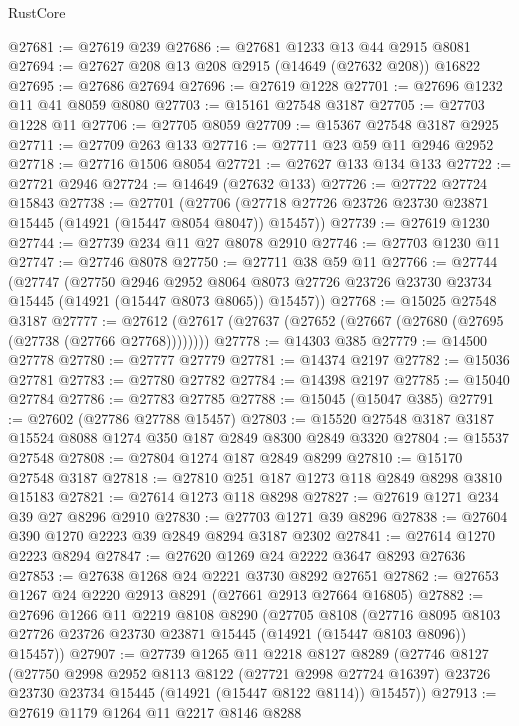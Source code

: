 \begin{lexlean}{RustCore}
\begin{coremodule}
@27681 := @27619 @239
@27686 := @27681 @1233 @13 @44 @2915 @8081
@27694 := @27627 @208 @13 @208 @2915 (@14649 (@27632 @208)) @16822
@27695 := @27686 @27694
@27696 := @27619 @1228
@27701 := @27696 @1232 @11 @41 @8059 @8080
@27703 := @15161 @27548 @3187
@27705 := @27703 @1228 @11
@27706 := @27705 @8059
@27709 := @15367 @27548 @3187 @2925
@27711 := @27709 @263 @133
@27716 := @27711 @23 @59 @11 @2946 @2952
@27718 := @27716 @1506 @8054
@27721 := @27627 @133 @134 @133
@27722 := @27721 @2946
@27724 := @14649 (@27632 @133)
@27726 := @27722 @27724 @15843
@27738 := @27701
    (@27706 (@27718 @27726 @23726 @23730 @23871 @15445 (@14921 (@15447 @8054 @8047)) @15457))
@27739 := @27619 @1230
@27744 := @27739 @234 @11 @27 @8078 @2910
@27746 := @27703 @1230 @11
@27747 := @27746 @8078
@27750 := @27711 @38 @59 @11
@27766 := @27744
    (@27747
      (@27750
        @2946
        @2952
        @8064
        @8073
        @27726
        @23726
        @23730
        @23734
        @15445
        (@14921 (@15447 @8073 @8065))
        @15457))
@27768 := @15025 @27548 @3187
@27777 := @27612 (@27617 (@27637 (@27652 (@27667 (@27680 (@27695 (@27738 (@27766 @27768))))))))
@27778 := @14303 @385
@27779 := @14500 @27778
@27780 := @27777 @27779
@27781 := @14374 @2197
@27782 := @15036 @27781
@27783 := @27780 @27782
@27784 := @14398 @2197
@27785 := @15040 @27784
@27786 := @27783 @27785
@27788 := @15045 (@15047 @385)
@27791 := @27602 (@27786 @27788 @15457)
@27803 := @15520 @27548 @3187 @3187 @15524 @8088 @1274 @350 @187 @2849 @8300 @2849 @3320
@27804 := @15537 @27548
@27808 := @27804 @1274 @187 @2849 @8299
@27810 := @15170 @27548 @3187
@27818 := @27810 @251 @187 @1273 @118 @2849 @8298 @3810 @15183
@27821 := @27614 @1273 @118 @8298
@27827 := @27619 @1271 @234 @39 @27 @8296 @2910
@27830 := @27703 @1271 @39 @8296
@27838 := @27604 @390 @1270 @2223 @39 @2849 @8294 @3187 @2302
@27841 := @27614 @1270 @2223 @8294
@27847 := @27620 @1269 @24 @2222 @3647 @8293 @27636
@27853 := @27638 @1268 @24 @2221 @3730 @8292 @27651
@27862 := @27653 @1267 @24 @2220 @2913 @8291 (@27661 @2913 @27664 @16805)
@27882 := @27696
    @1266
    @11
    @2219
    @8108
    @8290
    (@27705
      @8108
      (@27716 @8095 @8103 @27726 @23726 @23730 @23871 @15445 (@14921 (@15447 @8103 @8096)) @15457))
@27907 := @27739
    @1265
    @11
    @2218
    @8127
    @8289
    (@27746
      @8127
      (@27750
        @2998
        @2952
        @8113
        @8122
        (@27721 @2998 @27724 @16397)
        @23726
        @23730
        @23734
        @15445
        (@14921 (@15447 @8122 @8114))
        @15457))
@27913 := @27619 @1179 @1264 @11 @2217 @8146 @8288

\end{coremodule}
\end{lexlean}
